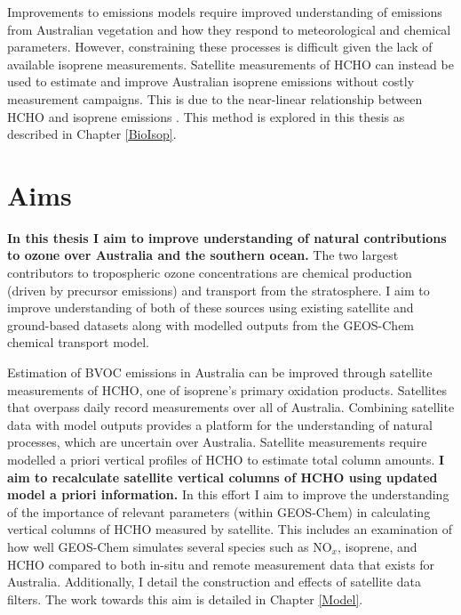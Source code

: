     Improvements to emissions models require improved understanding of emissions from Australian vegetation and how they respond to meteorological and chemical parameters.
    However, constraining these processes is difficult given the lack of available isoprene measurements.
    Satellite measurements of HCHO can instead be used to estimate and improve Australian isoprene emissions without costly measurement campaigns.
    This is due to the near-linear relationship between HCHO and isoprene emissions \parencite[e.g.,][]{Palmer2001, Millet2006, Bauwens2016}.
    This method is explored in this thesis as described in Chapter \ref{BioIsop}.
  
    

  
\section{Aims}
\label{LR:Aims}

  \textbf{In this thesis I aim to improve understanding of natural contributions to ozone over Australia and the southern ocean.}
  The two largest contributors to tropospheric ozone concentrations are chemical production (driven by precursor emissions) and transport from the stratosphere.
  I aim to improve understanding of both of these sources using existing satellite and ground-based datasets along with modelled outputs from the GEOS-Chem chemical transport model.
  
  Estimation of BVOC emissions in Australia can be improved through satellite measurements of HCHO, one of isoprene's primary oxidation products.
  Satellites that overpass daily record %
  measurements over all of Australia.
  Combining satellite data with model outputs provides a platform for the understanding of natural processes, which are uncertain over Australia.
  Satellite measurements require modelled a priori vertical profiles of HCHO to estimate total column amounts.
  \textbf{I aim to recalculate satellite vertical columns of HCHO using updated model a priori information.}
  In this effort I aim to improve the understanding of the importance of relevant parameters (within GEOS-Chem) in calculating vertical columns of HCHO measured by satellite.
  This includes an examination of how well GEOS-Chem simulates several species such as NO$_x$, isoprene, and HCHO compared to both in-situ and remote measurement data that exists for Australia.
  Additionally, I detail the construction and effects of satellite data filters.
  The work towards this aim is detailed in Chapter \ref{Model}.
  
